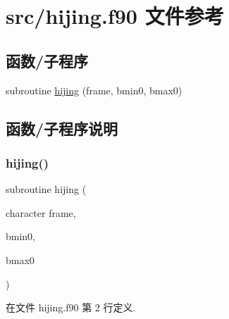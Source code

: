 \hypertarget{hijing_8f90}{}\section{src/hijing.f90 文件参考}
\label{hijing_8f90}
\subsection*{函数/子程序}
\begin{DoxyCompactItemize}
\item 
subroutine \mbox{\hyperlink{hijing_8f90_ad51fb6c82b6ffec874fa7794fa5ea822}{hijing}} (frame, bmin0, bmax0)
\end{DoxyCompactItemize}


\subsection{函数/子程序说明}
\mbox{\label{hijing_8f90_ad51fb6c82b6ffec874fa7794fa5ea822}} 
\subsubsection{\texorpdfstring{hijing()}{hijing()}}
{\footnotesize\ttfamily subroutine hijing (\begin{DoxyParamCaption}\item[{character}]{frame,  }\item[{}]{bmin0,  }\item[{}]{bmax0 }\end{DoxyParamCaption})}



在文件 hijing.\+f90 第 2 行定义.

